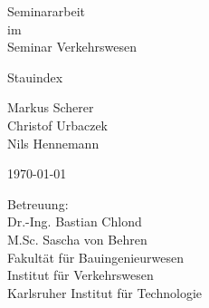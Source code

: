 \begin{titlepage}

    \par
    \hfill
    \par

    \vspace*{1cm} 

    \begin{center} \large 
    
        Seminararbeit \\
        im \\
        Seminar Verkehrswesen
    
        \vspace*{2cm}

        {\huge Stauindex}
        \vspace*{2.5cm}

        Markus Scherer\\
        Christof Urbaczek\\
        Nils Hennemann
    
        \vspace*{1.0cm}

        \today
        \vspace*{2.5cm}

        Betreuung:\\
        Dr.-Ing. Bastian Chlond\\
        M.Sc. Sascha von Behren \\[1cm]

        Fakultät für Bauingenieurwesen \\
        Institut für Verkehrswesen \\
        Karlsruher Institut für Technologie

    \end{center}
  \end{titlepage}
